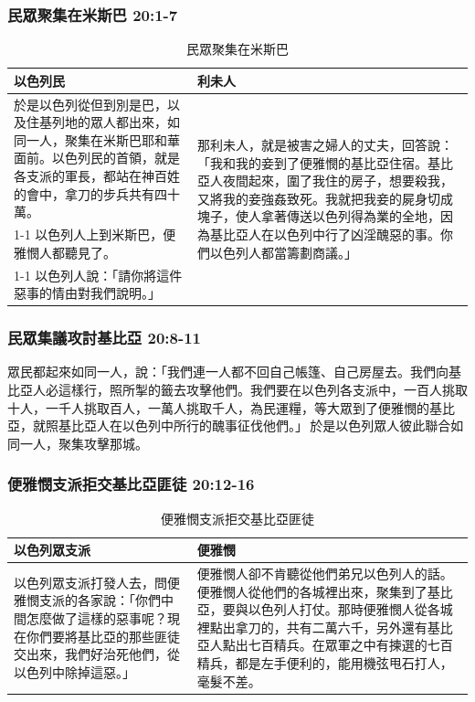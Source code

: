 \subsubsection{民眾聚集在米斯巴 20:1-7}
\begin{table}[H]
\centering
\begin{tabular}{p{8.6cm}|p{8.5cm}}\hline
以色列民&利未人\\\hline
於是以色列從但到別是巴，以及住基列地的眾人都出來，如同一人，聚集在米斯巴耶和華面前。以色列民的首領，就是各支派的軍長，都站在神百姓的會中，拿刀的步兵共有四十萬。&\multirow{3}{8.5cm}{那利未人，就是被害之婦人的丈夫，回答說：「我和我的妾到了便雅憫的基比亞住宿。基比亞人夜間起來，圍了我住的房子，想要殺我，又將我的妾強姦致死。我就把我妾的屍身切成塊子，使人拿著傳送以色列得為業的全地，因為基比亞人在以色列中行了凶淫醜惡的事。你們以色列人都當籌劃商議。」}\\\cline{1-1}
以色列人上到米斯巴，便雅憫人都聽見了。&\\\cline{1-1}
以色列人說：「請你將這件惡事的情由對我們說明。」&\\\hline
\end{tabular}
\caption{民眾聚集在米斯巴}
\end{table}  


\subsubsection{民眾集議攻討基比亞 20:8-11}
眾民都起來如同一人，說：「我們連一人都不回自己帳篷、自己房屋去。我們向基比亞人必這樣行，照所掣的籤去攻擊他們。我們要在以色列各支派中，一百人挑取十人，一千人挑取百人，一萬人挑取千人，為民運糧，等大眾到了便雅憫的基比亞，就照基比亞人在以色列中所行的醜事征伐他們。」 於是以色列眾人彼此聯合如同一人，聚集攻擊那城。

\subsubsection{便雅憫支派拒交基比亞匪徒 20:12-16}
\begin{table}[H]
\centering
\begin{tabular}{p{6.6cm}|p{10.95cm}}\hline
以色列眾支派&便雅憫\\\hline
以色列眾支派打發人去，問便雅憫支派的各家說：「你們中間怎麼做了這樣的惡事呢？現在你們要將基比亞的那些匪徒交出來，我們好治死他們，從以色列中除掉這惡。」
&便雅憫人卻不肯聽從他們弟兄以色列人的話。便雅憫人從他們的各城裡出來，聚集到了基比亞，要與以色列人打仗。那時便雅憫人從各城裡點出拿刀的，共有二萬六千，另外還有基比亞人點出七百精兵。在眾軍之中有揀選的七百精兵，都是左手便利的，能用機弦甩石打人，毫髮不差。\\\hline
\end{tabular}
\caption{便雅憫支派拒交基比亞匪徒}
\end{table}  


